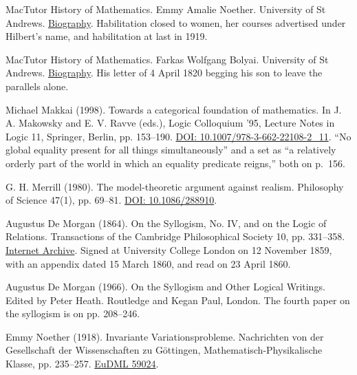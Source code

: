 \documentclass[11pt,twoside]{article}
\theoremstyle{thielethm}
\theoremstyle{thieledef}
\theoremstyle{thieledef}
\theoremstyle{thieledef}
\theoremstyle{thielethm}
\theoremstyle{thieleobs}
\theoremstyle{thielethm}
\begin{document}
\noindent MacTutor History of Mathematics. Emmy Amalie Noether. University of St Andrews. \href{https://mathshistory.st-andrews.ac.uk/Biographies/Noether_Emmy/}{Biography}. Habilitation closed to women, her courses advertised under Hilbert's name, and habilitation at last in 1919.
\par\medskip

\noindent MacTutor History of Mathematics. Farkas Wolfgang Bolyai. University of St Andrews. \href{https://mathshistory.st-andrews.ac.uk/Biographies/Bolyai_Farkas/}{Biography}. His letter of 4 April 1820 begging his son to leave the parallels alone.
\par\medskip

\noindent Michael Makkai (1998). Towards a categorical foundation of mathematics. In J. A. Makowsky and E. V. Ravve (eds.), Logic Colloquium '95, Lecture Notes in Logic 11, Springer, Berlin, pp. 153--190. \href{https://doi.org/10.1007/978-3-662-22108-2_11}{DOI: 10.1007/978-3-662-22108-2\_11}. ``No global equality present for all things simultaneously'' and a set as ``a relatively orderly part of the world in which an equality predicate reigns,'' both on p.~156.
\par\medskip

\noindent G. H. Merrill (1980). The model-theoretic argument against realism. Philosophy of Science 47(1), pp. 69--81. \href{https://doi.org/10.1086/288910}{DOI: 10.1086/288910}.
\par\medskip

\noindent Augustus De Morgan (1864). On the Syllogism, No. IV, and on the Logic of Relations. Transactions of the Cambridge Philosophical Society 10, pp. 331--358. \href{https://archive.org/details/transactionsofca10camb}{Internet Archive}. Signed at University College London on 12 November 1859, with an appendix dated 15 March 1860, and read on 23 April 1860.
\par\medskip

\noindent Augustus De Morgan (1966). On the Syllogism and Other Logical Writings. Edited by Peter Heath. Routledge and Kegan Paul, London. The fourth paper on the syllogism is on pp. 208--246.
\par\medskip

\noindent Emmy Noether (1918). Invariante Variationsprobleme. Nachrichten von der Gesellschaft der Wissenschaften zu G\"ottingen, Mathematisch-Physikalische Klasse, pp. 235--257. \href{https://eudml.org/doc/59024}{EuDML 59024}.
\par\medskip
\end{document}

